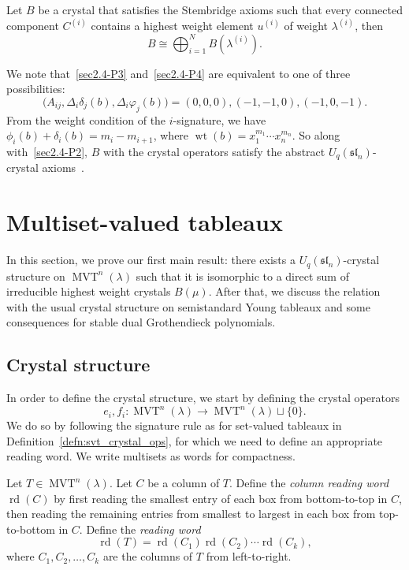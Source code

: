 \documentclass[ALCO,ThmDefs,Unicode,epreuves]{cedram}
\newcommand{\iso}{\cong}
\newcommand{\fsl}{\mathfrak{sl}}
\DeclareMathOperator{\wt}{wt} %
\DeclareMathOperator{\rd}{rd} %
\DeclareMathOperator{\mvt}{MVT} %
\newcommand{\defn}[1]{{\color{darkred}\emph{#1}}} %
\begin{document}
\begin{theo}
\label{thm:stembridge}
Let $B$ be a crystal that satisfies the Stembridge axioms such that every connected component $C^{(i)}$ contains a highest weight element $u^{(i)}$ of weight $\lambda^{(i)}$, then
\[
B \iso \bigoplus_{i=1}^N B(\lambda^{(i)}).
\]
\end{theo}

We note that~\ref{sec2.4-P3} and~\ref{sec2.4-P4} are equivalent to one of three possibilities:
\[
\bigl( A_{ij}, \Delta_i \delta_j(b), \Delta_i \varphi_j(b) \bigr) = (0,0,0), (-1, -1, 0), (-1, 0, -1).
\]
From the weight condition of the $i$-signature, we have $\phi_i(b) + \delta_i(b) = m_i - m_{i+1}$, where $\wt(b) = x_1^{m_1} \dotsm x_n^{m_n}$. So along with~\ref{sec2.4-P2}, $B$ with the crystal operators satisfy the abstract $U_q(\fsl_n)$-crystal axioms~\cite{K93}.








\section{Multiset-valued tableaux}
\label{sec:crystal_MVT}

In this section, we prove our first main result: there exists a $U_q(\fsl_n)$-crystal structure on $\mvt^n(\lambda)$ such that it is isomorphic to a direct sum of irreducible highest weight crystals $B(\mu)$.
After that, we discuss the relation with the usual crystal structure on semistandard Young tableaux and some consequences for stable dual Grothendieck polynomials.


\subsection{Crystal structure}

In order to define the crystal structure, we start by defining the crystal operators 
\[
e_i, f_i \colon \mvt^n(\lambda) \to \mvt^n(\lambda) \sqcup \{0\}.
\]
We do so by following the signature rule as for set-valued tableaux in Definition~\ref{defn:svt_crystal_ops}, for which we need to define an appropriate reading word.
We write multisets as words for compactness.

\begin{defi}
Let $T \in \mvt^n(\lambda)$.
Let $C$ be a column of $T$. Define the \defn{column reading word} $\rd(C)$ by first reading the smallest entry of each box from bottom-to-top in $C$, then reading the remaining entries from smallest to largest in each box from top-to-bottom in $C$.
Define the \defn{reading word} 
\[
\rd(T) = \rd(C_1) \rd(C_2) \dotsm \rd(C_k),
\]
 where $C_1, C_2, \dotsc, C_k$ are the columns of $T$ from left-to-right.
\end{defi}
\end{document}
